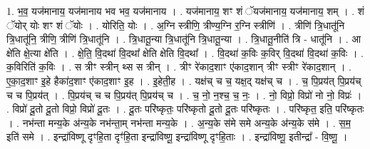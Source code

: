 \documentclass[17pt]{extarticle}
\begin{document}
1. भ॒व॒ यज॑मानाय॒ यज॑मानाय भव भव॒ यज॑मानाय । . यज॑मानाय॒ शꣳ शं ॅयज॑मानाय॒ यज॑मानाय॒ शम् । . शं ॅयोर् योः शꣳ शं ॅयोः । . योरिति॒ योः । . अ॒ग्नि स्त्रीणि॒ त्रीण्य॒ग्नि र॒ग्नि स्त्रीणि॑ । . त्रीणि॑ त्रि॒धातू॑नि त्रि॒धातू॑नि॒ त्रीणि॒ त्रीणि॑ त्रि॒धातू॑नि । . त्रि॒धातू॒न्या त्रि॒धातू॑नि त्रि॒धातू॒न्या । . त्रि॒धातू॒नीति॑ त्रि - धातू॑नि । . आ क्षे॑ति क्षे॒त्या क्षे॑ति । . क्षे॒ति॒ वि॒दथा॑ वि॒दथा᳚ क्षेति क्षेति वि॒दथा᳚ । . वि॒दथा॑ क॒विः क॒विर् वि॒दथा॑ वि॒दथा॑ क॒विः । . क॒विरिति॑ क॒विः । . स त्रीꣳ स्त्रीन् थ्स स त्रीन् । . त्रीꣳ रे॑काद॒शाꣳ ए॑काद॒शान् त्रीꣳ स्त्रीꣳ रे॑काद॒शान् । . ए॒का॒द॒शाꣳ इ॒हे हैका॑द॒शाꣳ ए॑काद॒शाꣳ इ॒ह । . इ॒हेती॒ह । . यक्ष॑च् च च॒ यक्ष॒द् यक्ष॑च् च । . च॒ पि॒प्रय॑त् पि॒प्रय॑च् च च पि॒प्रय॑त् । . पि॒प्रय॑च् च च पि॒प्रय॑त् पि॒प्रय॑च् च । . च॒ नो॒ न॒श्च॒ च॒ नः॒ । . नो॒ विप्रो॒ विप्रो॑ नो नो॒ विप्रः॑ । . विप्रो॑ दू॒तो दू॒तो विप्रो॒ विप्रो॑ दू॒तः । . दू॒तः परि॑ष्कृतः॒ परि॑ष्कृतो दू॒तो दू॒तः परि॑ष्कृतः । . परि॑ष्कृत॒ इति॒ परि॑ष्कृतः । . नभ॑न्ता मन्य॒के अ॑न्य॒के नभ॑न्ता॒म् नभ॑न्ता मन्य॒के । . अ॒न्य॒के स॑मे समे अन्य॒के अ॑न्य॒के स॑मे । . स॒म॒ इति॑ समे । . इन्द्रा॑विष्णू दृꣳहि॒ता दृꣳ॑हि॒ता इन्द्रा॑विष्णू॒ इन्द्रा॑विष्णू दृꣳहि॒ताः । . इन्द्रा॑विष्णू॒ इतीन्द्रा᳚ - वि॒ष्णू॒ । \newline
\end{document}
